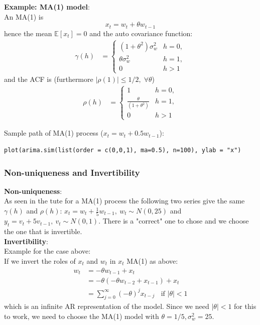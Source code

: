 \documentclass[11pt]{article}
\newcommand{\noi}{\noindent}
\begin{document}
\noi \textbf{Example: MA(1) model}: \\
\noi An MA(1) is
$$x_t = w_t + \theta w_{t-1}$$
\noi hence the mean $\mathbb{E}[x_t] = 0$ and the auto covariance function:
\begin{align*}
    \gamma(h) &= \begin{cases}
        (1+\theta^2)\sigma_w^2 & h = 0, \\
        \theta\sigma_w^2 & h=1, \\
        0 & h > 1
    \end{cases}
\end{align*} \phantom{i}
\noi and the ACF is (furthermore $|\rho(1)| \leq 1/2, \; \forall \theta$)
\begin{align*}
    \rho(h) &= \begin{cases}
        1 & h = 0, \\
        \frac{\theta}{(1+\theta^2)} & h=1, \\
        0 & h >1
    \end{cases}
\end{align*} \phantom{i}

\noi Sample path of MA(1) process ($x_t = w_t + 0.5w_{t-1}$):
\begin{lstlisting}
plot(arima.sim(list(order = c(0,0,1), ma=0.5), n=100), ylab = "x")
\end{lstlisting}

\subsubsection{Non-uniqueness and Invertibility}
\noi \textbf{Non-uniqueness}: \\
\noi As seen in the tute for a MA(1) process the following two series give the same $\gamma(h)$ and $\rho(h)$: $x_t = w_t + \frac{1}{5}w_{t-1}, \ w_t\sim N(0, 25)$ and $y_t = v_t + 5v_{t-1}, \ v_t \sim N(0,1)$. There is a "correct" one to chose and we choose the one that is invertible. \\

\noi \textbf{Invertibility}: \\
\noi Example for the case above: \\
\noi If we invert the roles of $x_t$ and $w_t$ in $x_t$ MA(1) as above:
\begin{align*}
    w_t &= -\theta w_{t-1} + x_t \\
    &= -\theta(-\theta w_{t-2} + x_{t-1}) + x_t \\
    &= \sum_{j=0}^{\infty} (-\theta)^jx_{t-j} \; \; \text{ if } |\theta| < 1
\end{align*}
\noi which is an infinite AR representation of the model. Since we need $|\theta| < 1$ for this to work, we need to choose the MA(1) model with $\theta=1/5, \sigma_w^2=25$. \\
\end{document}
